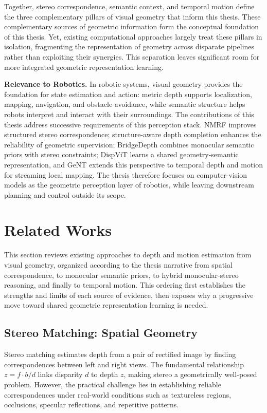 Together, stereo correspondence, semantic context, and temporal motion define the three complementary pillars of visual geometry that inform this thesis.
These complementary sources of geometric information form the conceptual foundation of this thesis.
Yet, existing computational approaches largely treat these pillars in isolation, fragmenting the representation of geometry across disparate pipelines rather than exploiting their synergies.
This separation leaves significant room for more integrated geometric representation learning.

\noindent\textbf{Relevance to Robotics.} In robotic systems, visual geometry provides the foundation for state estimation and action: metric depth supports localization, mapping, navigation, and obstacle avoidance, while semantic structure helps robots interpret and interact with their surroundings.
The contributions of this thesis address successive requirements of this perception stack.
NMRF improves structured stereo correspondence; structure-aware depth completion enhances the reliability of geometric supervision; BridgeDepth combines monocular semantic priors with stereo constraints; DispViT learns a shared geometry-semantic representation, and GeNT extends this perspective to temporal depth and motion for streaming local mapping.
The thesis therefore focuses on computer-vision models as the geometric perception layer of robotics, while leaving downstream planning and control outside its scope.

\section{Related Works}

This section reviews existing approaches to depth and motion estimation from visual geometry, organized according to the thesis narrative from spatial correspondence, to monocular semantic priors, to hybrid monocular-stereo reasoning, and finally to temporal motion.
This ordering first establishes the strengths and limits of each source of evidence, then exposes why a progressive move toward shared geometric representation learning is needed.

\subsection{Stereo Matching: Spatial Geometry}

Stereo matching estimates depth from a pair of rectified image by finding correspondences between left and right views.
The fundamental relationship $z=f\cdot b / d$ links disparity $d$ to depth $z$, making stereo a geometrically well-posed problem.
However, the practical challenge lies in establishing reliable correspondences under real-world conditions such as textureless regions, occlusions, specular reflections, and repetitive patterns.

